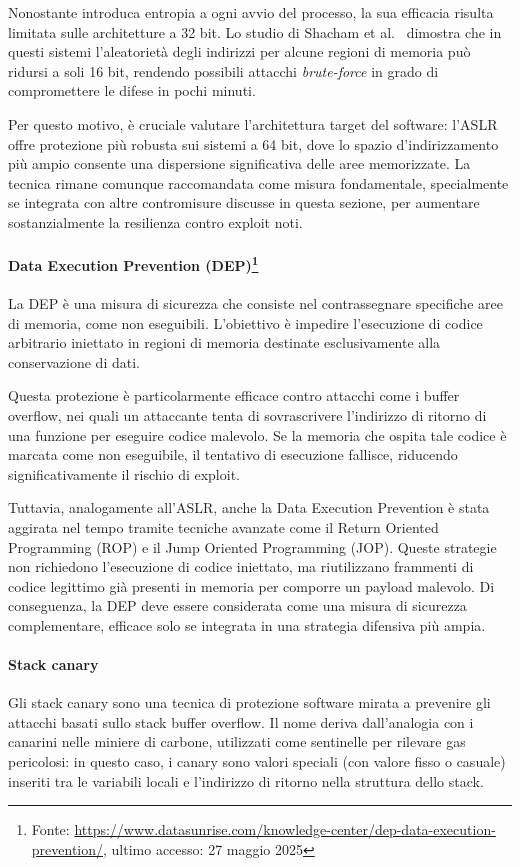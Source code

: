 Nonostante introduca entropia a ogni avvio del processo, la sua efficacia
risulta limitata sulle architetture a 32 bit. Lo studio di Shacham et al.~\cite{aslr_effectiveness}
dimostra che in questi sistemi l'aleatorietà degli indirizzi per alcune regioni di
memoria può ridursi a soli 16 bit, rendendo possibili attacchi \textit{brute-force}
in grado di compromettere le difese in pochi minuti.

Per questo motivo, è cruciale valutare l'architettura target del software: l'ASLR
offre protezione più robusta sui sistemi a 64 bit, dove lo spazio d'indirizzamento
più ampio consente una dispersione significativa delle aree memorizzate. La tecnica
rimane comunque raccomandata come misura fondamentale, specialmente se integrata
con altre contromisure discusse in questa sezione, per aumentare sostanzialmente
la resilienza contro exploit noti.

\paragraph{Data Execution Prevention (DEP)\protect\footnote{Fonte: \url{https://www.datasunrise.com/knowledge-center/dep-data-execution-prevention/},
ultimo accesso: 27 maggio 2025}}
La DEP è una misura di sicurezza che consiste nel contrassegnare specifiche aree
di memoria, come non eseguibili. L'obiettivo è impedire l'esecuzione di codice
arbitrario iniettato in regioni di memoria destinate esclusivamente alla
conservazione di dati.

Questa protezione è particolarmente efficace contro attacchi come i buffer
overflow, nei quali un attaccante tenta di sovrascrivere l'indirizzo di ritorno di
una funzione per eseguire codice malevolo. Se la memoria che ospita tale codice
è marcata come non eseguibile, il tentativo di esecuzione fallisce, riducendo
significativamente il rischio di exploit.

Tuttavia, analogamente all'ASLR, anche la Data Execution Prevention è stata
aggirata nel tempo tramite tecniche avanzate come il Return Oriented Programming
(ROP) e il Jump Oriented Programming (JOP). Queste strategie non richiedono l'esecuzione
di codice iniettato, ma riutilizzano frammenti di codice legittimo già presenti
in memoria per comporre un payload malevolo. Di conseguenza, la DEP deve essere
considerata come una misura di sicurezza complementare, efficace solo se integrata
in una strategia difensiva più ampia.

\paragraph{Stack canary}
Gli stack canary sono una tecnica di protezione software mirata a prevenire gli
attacchi basati sullo stack buffer overflow. Il nome deriva dall'analogia con i canarini
nelle miniere di carbone, utilizzati come sentinelle per rilevare gas pericolosi:
in questo caso, i canary sono valori speciali (con valore fisso o casuale)
inseriti tra le variabili locali e l'indirizzo di ritorno nella struttura dello
stack.

